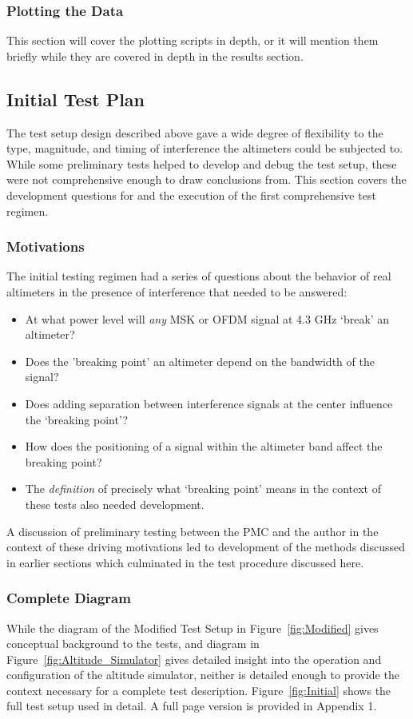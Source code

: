 \subsubsection{Plotting the Data}
This section will cover the plotting scripts in depth, or it will mention them briefly while they are covered in depth in the results section. 
\subsection{Initial Test Plan}
The test setup design described above gave a wide degree of flexibility to the type, magnitude, and timing of interference the altimeters could be subjected to. While some preliminary tests helped to develop and debug the test setup, these were not comprehensive enough to draw conclusions from. This section covers the development questions for and the execution of the first  comprehensive test regimen. 

\subsubsection{Motivations}
The initial testing regimen had a series of questions about the behavior of real altimeters in the presence of interference that needed to be answered: 

\begin{itemize}
\item At what power level will \textit{any} MSK or OFDM signal at 4.3 GHz `break' an altimeter?
\item Does the 'breaking point' an altimeter depend on the bandwidth of the signal?
\item Does adding separation between interference signals at the center influence the `breaking point'? 
\item How does the positioning of a signal within the altimeter band affect the breaking point?
\item The \textit{definition} of precisely what `breaking point' means in the context of these tests also needed development.  
\end{itemize}

A discussion of preliminary testing between the PMC and the author in the context of these driving motivations led to development of the methods discussed in earlier sections which culminated in the test procedure discussed here.  

\subsubsection{Complete Diagram}
While the diagram of the Modified Test Setup in Figure~\ref{fig:Modified} gives conceptual background to the tests, and diagram in Figure~\ref{fig:Altitude_Simulator} gives detailed insight into the operation and configuration of the altitude simulator, neither is detailed enough to provide the context necessary for a complete test description. Figure~\ref{fig:Initial} shows the full test setup used in detail. A full page version is provided in Appendix 1. 




